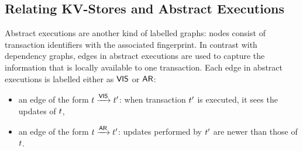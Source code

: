 \subsection{Relating KV-Stores and Abstract Executions}
Abstract executions are another kind of labelled 
graphs: nodes consist of transaction identifiers with the associated fingerprint. %
In contrast with dependency graphs, edges in abstract executions are used to 
capture the information that is locally available to one transaction. Each 
edge in abstract executions is labelled either as $\mathsf{VIS}$ or $\mathsf{AR}$: 
\begin{itemize}
\item an edge of the form $t \xrightarrow{\mathsf{VIS}} t'$:  when transaction 
$t'$ is executed, it sees the updates of $t$,
\item an edge of the form $t \xrightarrow{\mathsf{AR}} t'$: updates 
performed by $t'$ are newer than those of $t$. 
\end{itemize}
